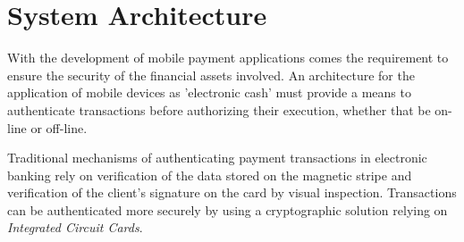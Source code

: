 \section{System Architecture}
\label{chap:hardware_architecture}
With the development of mobile payment applications comes the requirement to ensure the security of the financial assets involved.
An architecture for the application of mobile devices as 'electronic cash' must provide a means to authenticate transactions before authorizing their execution, whether that be on-line or off-line.


Traditional mechanisms of authenticating payment transactions in electronic banking rely on verification of the data stored on the magnetic stripe and verification of the client's signature on the card by visual inspection.
Transactions can be authenticated more securely by using a cryptographic solution relying on \textit{Integrated Circuit Cards}.

